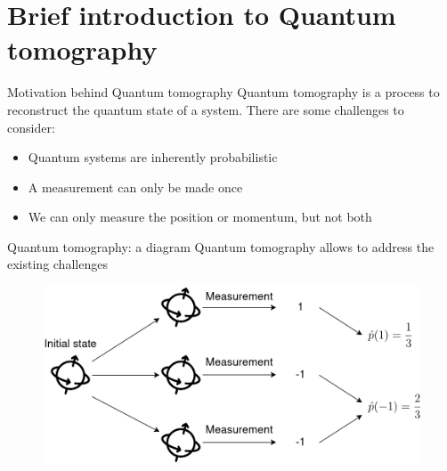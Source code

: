 \documentclass{beamer}
\begin{document}
\section{Brief introduction to Quantum tomography}
\begin{frame}{Motivation behind Quantum tomography}
    Quantum tomography is a process to reconstruct the quantum state of a system.\medbreak
    There are some challenges to consider: 
    \begin{itemize}
        \item Quantum systems are inherently probabilistic
        \item A measurement can only be made once
        \item We can only measure the position or momentum, but not both
    \end{itemize}
\end{frame}
\begin{frame}{Quantum tomography: a diagram}
    Quantum tomography allows to address the existing challenges\medbreak %
    \begin{figure}[H]
            \centering
            \includegraphics[width=\textwidth]{figures/diagram_qt_zoom_final.png}
        
        \end{figure}

\end{frame}
\end{document}
